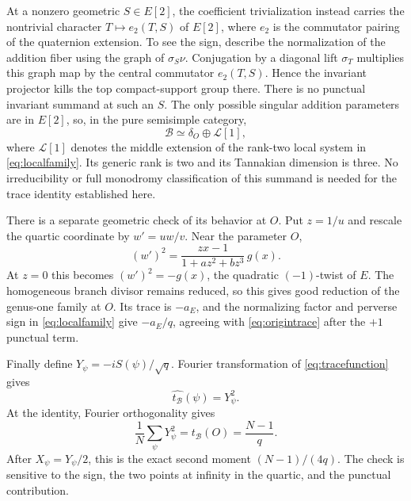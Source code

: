 \documentclass[
  11pt,
  a4paper,
]{article}
\newcommand{\B}{\mathcal B}
\begin{document}
At a nonzero geometric $S\in E[2]$, the coefficient trivialization instead carries the nontrivial character $T\mapsto e_2(T,S)$ of $E[2]$, where $e_2$ is the commutator pairing of the quaternion extension. To see the sign, describe the normalization of the addition fiber using the graph of $\sigma_S\nu$. Conjugation by a diagonal lift $\sigma_T$ multiplies this graph map by the central commutator $e_2(T,S)$. Hence the invariant projector kills the top compact-support group there. There is no punctual invariant summand at such an $S$. The only possible singular addition parameters are in $E[2]$, so, in the pure semisimple category,
\begin{equation}\label{eq:Bdecomp}
 \B\simeq\delta_O\oplus\mathcal L[1],
\end{equation}
where $\mathcal L[1]$ denotes the middle extension of the rank-two local system in \eqref{eq:localfamily}. Its generic rank is two and its Tannakian dimension is three. No irreducibility or full monodromy classification of this summand is needed for the trace identity established here.

There is a separate geometric check of its behavior at $O$. Put $z=1/u$ and rescale the quartic coordinate by $w'=uw/v$. Near the parameter $O$,
\begin{equation}\label{eq:limit}
 (w')^2=\frac{z x-1}{1+az^2+bz^3}\,g(x).
\end{equation}
At $z=0$ this becomes $(w')^2=-g(x)$, the quadratic $(-1)$-twist of $E$. The homogeneous branch divisor remains reduced, so this gives good reduction of the genus-one family at $O$. Its trace is $-a_E$, and the normalizing factor and perverse sign in \eqref{eq:localfamily} give $-a_E/q$, agreeing with \eqref{eq:origintrace} after the $+1$ punctual term.

Finally define $Y_\psi=-iS(\psi)/\sqrt q$. Fourier transformation of \eqref{eq:tracefunction} gives
\begin{equation}\label{eq:square}
 \boxed{\widehat{t_{\B}}(\psi)=Y_\psi^2.}
\end{equation}
At the identity, Fourier orthogonality gives
\begin{equation}
 \frac1N\sum_\psi Y_\psi^2=t_{\B}(O)=\frac{N-1}{q}.
\end{equation}
After $X_\psi=Y_\psi/2$, this is the exact second moment $(N-1)/(4q)$. The check is sensitive to the sign, the two points at infinity in the quartic, and the punctual contribution.
\end{document}
